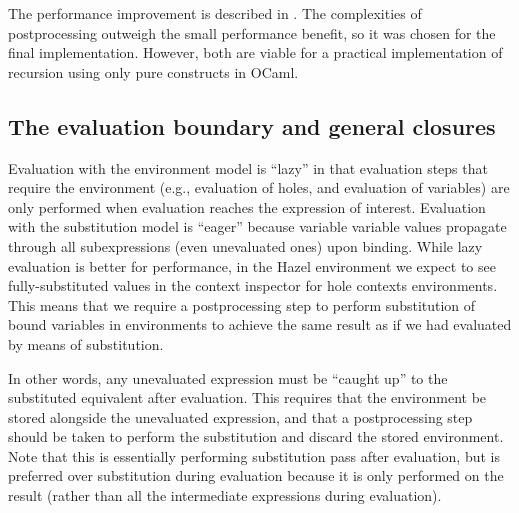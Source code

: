The performance improvement is described in . The complexities of postprocessing outweigh the small performance benefit, so it was chosen for the final implementation. However, both are viable for a practical implementation of recursion using only pure constructs in OCaml.


\subsection{The evaluation boundary and general closures}
\label{sec:closures_to_lambdas}

Evaluation with the environment model is ``lazy'' in that evaluation steps that require the environment (e.g., evaluation of holes, and evaluation of variables) are only performed when evaluation reaches the expression of interest. Evaluation with the substitution model is ``eager'' because variable variable values propagate through all subexpressions (even unevaluated ones) upon binding. While lazy evaluation is better for performance, in the Hazel environment we expect to see fully-substituted values in the context inspector for hole contexts environments. This means that we require a postprocessing step to perform substitution of bound variables in environments to achieve the same result as if we had evaluated by means of substitution.

In other words, any unevaluated expression must be ``caught up'' to the substituted equivalent after evaluation. This requires that the environment be stored alongside the unevaluated expression, and that a postprocessing step should be taken to perform the substitution and discard the stored environment. Note that this is essentially performing substitution pass after evaluation, but is preferred over substitution during evaluation because it is only performed on the result (rather than all the intermediate expressions during evaluation).

